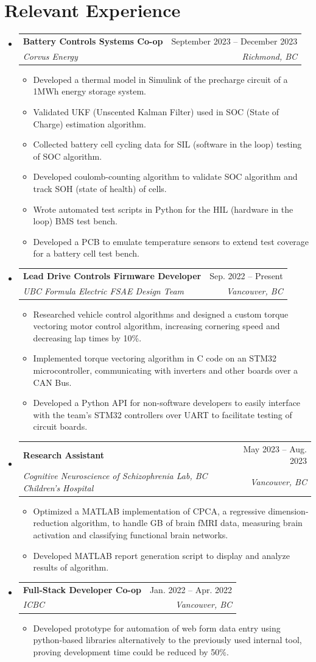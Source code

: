 \documentclass[letterpaper,11pt]{article}
\makeatletter
\newcommand{\resumeItem}[1]{
  \item\small{
    {#1 \vspace{-2pt}}
  }
}
\newcommand{\resumeSubheading}[4]{
  \vspace{-2pt}\item
    \begin{tabular*}{0.97\textwidth}[t]{l@{\extracolsep{\fill}}r}
      \textbf{#1} & #2 \\
      \textit{\small#3} & \textit{\small #4} \\
    \end{tabular*}\vspace{-7pt}
}
\newcommand{\resumeSubHeadingListStart}{\begin{itemize}[leftmargin=0.15in, label={}]}
\newcommand{\resumeSubHeadingListEnd}{\end{itemize}}
\newcommand{\resumeItemListStart}{\begin{itemize}}
\newcommand{\resumeItemListEnd}{\end{itemize}\vspace{-5pt}}
\makeatother
\begin{document}
\section{Relevant Experience}
  \resumeSubHeadingListStart
    \resumeSubheading
      {Battery Controls Systems Co-op}{September 2023 -- December 2023}
      {Corvus Energy}{Richmond, BC}
      \resumeItemListStart
        \resumeItem{Developed a thermal model in Simulink of the precharge circuit of a 1MWh energy storage system.}
        \resumeItem{Validated UKF (Unscented Kalman Filter) used in SOC (State of Charge) estimation algorithm.}
        \resumeItem{Collected battery cell cycling data for SIL (software in the loop) testing of SOC algorithm.} 
        \resumeItem{Developed coulomb-counting algorithm to validate SOC algorithm and track SOH (state of health) of cells.}
        \resumeItem{Wrote automated test scripts in Python for the HIL (hardware in the loop) BMS test bench.}
        \resumeItem{Developed a PCB to emulate temperature sensors to extend test coverage for a battery cell test bench.}
      \resumeItemListEnd
  \resumeSubheading
      {Lead Drive Controls Firmware Developer}{Sep. 2022 -- Present}
      {UBC Formula Electric FSAE Design Team}{Vancouver, BC}
      \resumeItemListStart
        \resumeItem{Researched vehicle control algorithms and designed a custom torque vectoring motor control algorithm, increasing cornering speed and decreasing lap times by 10\%.}
        \resumeItem{Implemented torque vectoring algorithm in C code on an STM32 microcontroller, communicating with inverters and other boards over a CAN Bus.}
        \resumeItem{Developed a Python API for non-software developers to easily interface with the team's STM32 controllers over UART to facilitate testing of circuit boards.}
      \resumeItemListEnd
    \resumeSubheading
      {Research Assistant}{May 2023 -- Aug. 2023}
      {Cognitive Neuroscience of Schizophrenia Lab, BC Children's Hospital}{Vancouver, BC}
      \resumeItemListStart
        \resumeItem{Optimized a MATLAB implementation of CPCA, a regressive dimension-reduction algorithm, to handle GB of brain fMRI data, measuring brain activation and classifying functional brain networks.}
        \resumeItem{Developed MATLAB report generation script to display and analyze results of algorithm. }
      \resumeItemListEnd
  \resumeSubheading
      {Full-Stack Developer Co-op}{Jan. 2022 -- Apr. 2022}
      {ICBC}{Vancouver, BC}
      \resumeItemListStart
        \resumeItem{Developed prototype for automation of web form data entry using python-based libraries alternatively to the previously used internal tool, 
        proving development time could be reduced by 50\%.}
      \resumeItemListEnd
  \resumeSubHeadingListEnd
\end{document}
